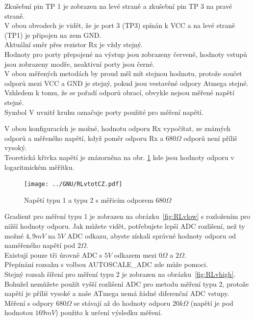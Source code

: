 Zkušební pin  TP 1 je zobrazen na levé straně a zkušební pin TP 3 na pravé straně.\\
V obou obvodech je vidět, že je port 3 (TP3) spínán k VCC a na levé straně (TP1) je připojen na
zem GND.\\
Aktuální směr přes rezistor Rx je vždy stejný.\\
Hodnoty pro porty přepojené na výstup jsou zobrazeny červeně,
hodnoty vstupů jsou zobrazeny modře, neaktivní porty jsou černé.\\
V obou měřených metodách by proud měl mít stejnou hodnotu, protože součet odporů mezi
VCC a GND je stejný, pokud jsou vestavěné odpory Atmega stejné.\\
Vzhledem k tomu, že se pořadí odporů obrací, obvykle nejsou měřené napětí stejné.\\
Symbol V uvnitř kruhu označuje porty použité pro měření napětí.

V obou konfiguracích je možné, hodnotu odporu Rx vypočítat, ze známých odporů
a měřeného napětí, když poměr odporu Rx a \(680\Omega\) odporů není příliš vysoký.\\
Teoretická křivka napětí je znázorněna na obr. \ref{fig:RLvtot} kde jsou hodnoty odporu
v logaritmickém měřítku.
\begin{figure}[H]
\centering
\texttt{[image: ../GNU/RLvtotCZ.pdf]}
\caption{Napětí typu 1 a typu 2 s měřicím odporem \(680\Omega\) }
\label{fig:RLvtot}
\end{figure}
Gradient pro měření typu 1 je zobrazen na obrázku~\ref{fig:RLvlow} s rozložením pro nižší hodnoty odporu.
Jak můžete vidět, potřebujete lepší  ADC rozlišení, než ty možné \(4,9mV\) na \(5V\) ADC odkazu, abyste získali správné hodnoty odporu od naměřeného napětí pod \(2\Omega\).\\
Existují pouze tři úrovně ADC s \(5V\) odkazem mezi \(0\Omega\) a \(2\Omega\).\\
Přepínání rozsahu s volbou AUTOSCALE\_ADC zde může pomoci.\\
Stejný rozsah šíření pro měření typu 2 je zobrazen na obrázku~\ref{fig:RLvhigh}.\\
Bohužel nemůžete použít vyšší rozlišení ADC pro metodu měření typu 2,
protože napětí je příliš vysoké a naše ATmega nemá žádné diferenční ADC vstupy.\\
Měření s odpory \(680\Omega\)  se stávají až do hodnoty odporu \(20k\Omega\)  (napětí je pod hodnotou \(169mV\)) použito k určení výsledku měření.

